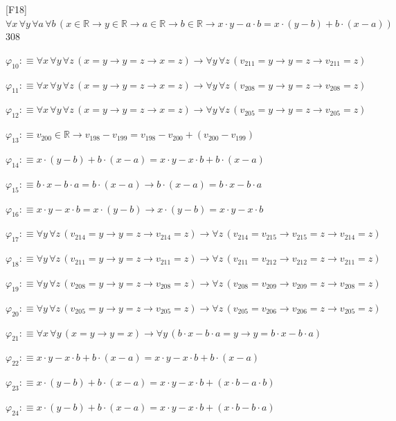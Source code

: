 \begin{fullproof}{[F18]}{$\forall x\,\forall y\,\forall a\,\forall b\,(x \in \mathbb{R} \to y \in \mathbb{R} \to a \in \mathbb{R} \to b \in \mathbb{R} \to x \cdot y - a \cdot b = x \cdot (y - b) + b \cdot (x - a))$}{308}
\begin{abbrevlist}
\item $\varphi_{10} :\equiv \forall x\,\forall y\,\forall z\,(x = y \to y = z \to x = z) \to \forall y\,\forall z\,(v_{211} = y \to y = z \to v_{211} = z)$
\item $\varphi_{11} :\equiv \forall x\,\forall y\,\forall z\,(x = y \to y = z \to x = z) \to \forall y\,\forall z\,(v_{208} = y \to y = z \to v_{208} = z)$
\item $\varphi_{12} :\equiv \forall x\,\forall y\,\forall z\,(x = y \to y = z \to x = z) \to \forall y\,\forall z\,(v_{205} = y \to y = z \to v_{205} = z)$
\item $\varphi_{13} :\equiv v_{200} \in \mathbb{R} \to v_{198} - v_{199} = v_{198} - v_{200} + (v_{200} - v_{199})$
\item $\varphi_{14} :\equiv x \cdot (y - b) + b \cdot (x - a) = x \cdot y - x \cdot b + b \cdot (x - a)$
\item $\varphi_{15} :\equiv b \cdot x - b \cdot a = b \cdot (x - a) \to b \cdot (x - a) = b \cdot x - b \cdot a$
\item $\varphi_{16} :\equiv x \cdot y - x \cdot b = x \cdot (y - b) \to x \cdot (y - b) = x \cdot y - x \cdot b$
\item $\varphi_{17} :\equiv \forall y\,\forall z\,(v_{214} = y \to y = z \to v_{214} = z) \to \forall z\,(v_{214} = v_{215} \to v_{215} = z \to v_{214} = z)$
\item $\varphi_{18} :\equiv \forall y\,\forall z\,(v_{211} = y \to y = z \to v_{211} = z) \to \forall z\,(v_{211} = v_{212} \to v_{212} = z \to v_{211} = z)$
\item $\varphi_{19} :\equiv \forall y\,\forall z\,(v_{208} = y \to y = z \to v_{208} = z) \to \forall z\,(v_{208} = v_{209} \to v_{209} = z \to v_{208} = z)$
\item $\varphi_{20} :\equiv \forall y\,\forall z\,(v_{205} = y \to y = z \to v_{205} = z) \to \forall z\,(v_{205} = v_{206} \to v_{206} = z \to v_{205} = z)$
\item $\varphi_{21} :\equiv \forall x\,\forall y\,(x = y \to y = x) \to \forall y\,(b \cdot x - b \cdot a = y \to y = b \cdot x - b \cdot a)$
\item $\varphi_{22} :\equiv x \cdot y - x \cdot b + b \cdot (x - a) = x \cdot y - x \cdot b + b \cdot (x - a)$
\item $\varphi_{23} :\equiv x \cdot (y - b) + b \cdot (x - a) = x \cdot y - x \cdot b + (x \cdot b - a \cdot b)$
\item $\varphi_{24} :\equiv x \cdot (y - b) + b \cdot (x - a) = x \cdot y - x \cdot b + (x \cdot b - b \cdot a)$

\end{abbrevlist}
\end{fullproof}
